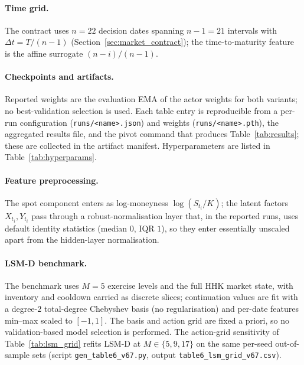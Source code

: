 \documentclass[a4paper,fleqn]{cas-dc}
\begin{document}
\paragraph{Time grid.} The contract uses $n=22$ decision dates spanning $n-1=21$ intervals with $\Delta t = T/(n-1)$ (Section~\ref{sec:market_contract}); the time-to-maturity feature is the affine surrogate $(n-i)/(n-1)$.

\paragraph{Checkpoints and artifacts.} Reported weights are the evaluation EMA of the actor weights for both variants; no best-validation selection is used. Each table entry is reproducible from a per-run configuration (\texttt{runs/\allowbreak <name>.json}) and weights (\texttt{runs/\allowbreak <name>.pth}), the aggregated results file, and the pivot command that produces Table~\ref{tab:results}; these are collected in the artifact manifest. Hyperparameters are listed in Table~\ref{tab:hyperparams}.

\paragraph{Feature preprocessing.} The spot component enters as log-moneyness $\log(S_{t_i}/K)$; the latent factors $X_{t_i},Y_{t_i}$ pass through a robust-normalisation layer that, in the reported runs, uses default identity statistics (median $0$, IQR $1$), so they enter essentially unscaled apart from the hidden-layer normalisation.

\paragraph{LSM-D benchmark.} The benchmark uses $M=5$ exercise levels and the full HHK market state, with inventory and cooldown carried as discrete slices; continuation values are fit with a degree-$2$ total-degree Chebyshev basis (no regularisation) and per-date features min--max scaled to $[-1,1]$. The basis and action grid are fixed a priori, so no validation-based model selection is performed. The action-grid sensitivity of Table~\ref{tab:lsm_grid} refits LSM-D at $M\in\{5,9,17\}$ on the same per-seed out-of-sample sets (script \texttt{gen\_table6\_v67.py}, output \texttt{table6\_lsm\_grid\_v67.csv}).
\end{document}
